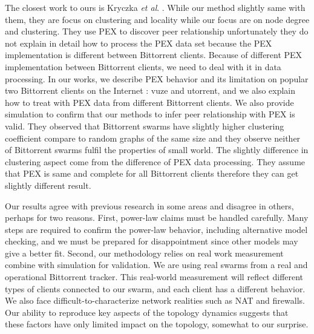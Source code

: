 \documentclass[paper]{ieice}
\begin{document}
The closest work to ours is Kryczka \textit{et al}. \cite{Kryczka2011}.
While our method slightly same with them, they are focus on clustering and locality while our focus are on node degree and clustering.
They use PEX to discover peer relationship unfortunately they do not explain in detail how to process the PEX data set because the PEX implementation is different between Bittorrent clients.
Because of different PEX implementation between Bittorrent clients, we need to deal with it in data processing.  
In our works, we describe PEX behavior and its limitation on popular two Bittorrent clients on the Internet : vuze and utorrent, and we also explain how to treat with PEX data from different Bittorrent clients. 
We also provide simulation to confirm that our methods to infer peer relationship with PEX is valid.  
They observed that Bittorrent swarms have slightly higher clustering coefficient compare to random graphs of the same size and they observe neither of Bittorrent swarms fulfil the properties of small world.
The slightly difference in clustering aspect come from the difference of PEX data processing. 
They assume that PEX is same and complete for all Bittorrent clients therefore they can get slightly different result. 

Our results agree with previous research \cite{dale2008evolution} in some areas and disagree in others, perhaps for two reasons.
First, power-law claims must be handled carefully. 
Many steps are required to confirm the power-law behavior, including alternative model checking, and we must be prepared for disappointment since other models may give a better fit. 
Second, our methodology relies on real work measurement combine with simulation for validation. 
We are using real swarms from a real and operational Bittorrent tracker. 
This real-world measurement will reflect different types of clients connected to our swarm, and each client has a different behavior. 
We also face difficult-to-characterize network realities such as NAT and firewalls. 
Our ability to reproduce key aspects of the topology dynamics suggests that these factors have only limited impact on the topology, somewhat to our surprise.
\end{document}
